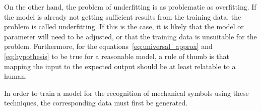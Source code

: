 On the other hand, the problem of underfitting is as problematic as overfitting.
If the model is already not getting sufficient results from the training data, the problem is called underfitting.
If this is the case, it is likely that the model or parameter will need to be adjusted, or that the training data is unsuitable for the problem.
Furthermore, for the equations~\eqref{eq:universal_approx} and \eqref{eq:hypothesis} to be true for a reasonable model, a rule of thumb is that mapping the input to the expected output should be at least relatable to a human.

In order to train a model for the recognition of mechanical symbols using these techniques, the corresponding data must first be generated.
